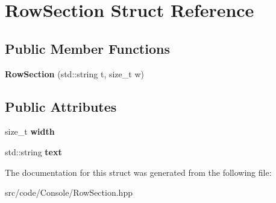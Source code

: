 \hypertarget{struct_row_section}{}\section{Row\+Section Struct Reference}
\label{struct_row_section}
\subsection*{Public Member Functions}
\begin{DoxyCompactItemize}
\item 
\mbox{\label{struct_row_section_a979e15cb3d9148a02fea22c0d7c460c4}} 
{\bfseries Row\+Section} (std\+::string t, size\+\_\+t w)
\end{DoxyCompactItemize}
\subsection*{Public Attributes}
\begin{DoxyCompactItemize}
\item 
\mbox{\label{struct_row_section_a6c926e103f5d00ee919a6b4dad059d06}} 
size\+\_\+t {\bfseries width}
\item 
\mbox{\label{struct_row_section_ab65f01d11d6c694ae48637f070f9607f}} 
std\+::string {\bfseries text}
\end{DoxyCompactItemize}


The documentation for this struct was generated from the following file\+:\begin{DoxyCompactItemize}
\item 
src/code/\+Console/Row\+Section.\+hpp\end{DoxyCompactItemize}
